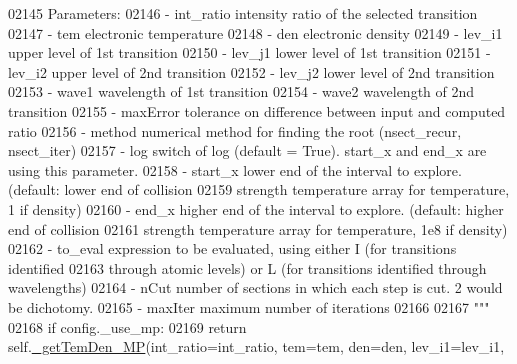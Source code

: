 \begin{DoxyCode}
02145 \textcolor{stringliteral}{        Parameters:}
02146 \textcolor{stringliteral}{            - int\_ratio    intensity ratio of the selected transition}
02147 \textcolor{stringliteral}{            - tem          electronic temperature}
02148 \textcolor{stringliteral}{            - den          electronic density}
02149 \textcolor{stringliteral}{            - lev\_i1       upper level of 1st transition}
02150 \textcolor{stringliteral}{            - lev\_j1       lower level of 1st transition}
02151 \textcolor{stringliteral}{            - lev\_i2       upper level of 2nd transition}
02152 \textcolor{stringliteral}{            - lev\_j2       lower level of 2nd transition}
02153 \textcolor{stringliteral}{            - wave1        wavelength of 1st transition}
02154 \textcolor{stringliteral}{            - wave2        wavelength of 2nd transition}
02155 \textcolor{stringliteral}{            - maxError     tolerance on difference between input and computed ratio }
02156 \textcolor{stringliteral}{            - method       numerical method for finding the root (nsect\_recur, nsect\_iter)}
02157 \textcolor{stringliteral}{            - log          switch of log (default = True). start\_x and end\_x are using this parameter.}
02158 \textcolor{stringliteral}{            - start\_x      lower end of the interval to explore. (default: lower end of collision }
02159 \textcolor{stringliteral}{                            strength temperature array for temperature, 1 if density)}
02160 \textcolor{stringliteral}{            - end\_x        higher end of the interval to explore. (default: higher end of collision }
02161 \textcolor{stringliteral}{                            strength temperature array for temperature, 1e8 if density)}
02162 \textcolor{stringliteral}{            - to\_eval      expression to be evaluated, using either I (for transitions identified }
02163 \textcolor{stringliteral}{                            through atomic levels) or L (for transitions identified through wavelengths)}
02164 \textcolor{stringliteral}{            - nCut        number of sections in which each step is cut. 2 would be dichotomy.}
02165 \textcolor{stringliteral}{            - maxIter     maximum number of iterations}
02166 \textcolor{stringliteral}{}
02167 \textcolor{stringliteral}{        """}        
02168         \textcolor{keywordflow}{if} config.\_use\_mp:
02169             \textcolor{keywordflow}{return} self.\hyperlink{classpyneb_1_1core_1_1pynebcore_1_1_atom_a3a7c4f43d58a5988d04cbe23ed9593ba}{\_getTemDen\_MP}(int\_ratio=int\_ratio, tem=tem, den=den, lev\_i1=lev\_i1, 

\end{DoxyCode}
